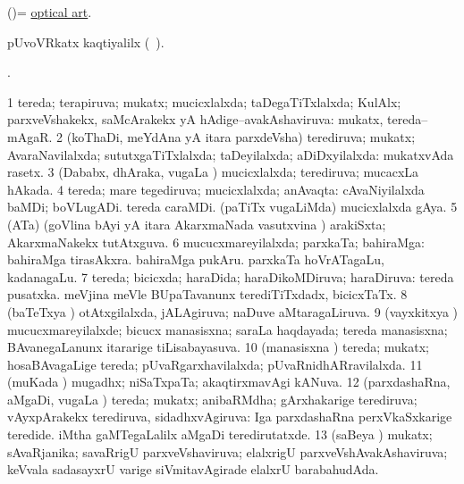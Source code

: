\bentry
{}
\gl{\nA}
\bmng
(\AmA)= \hyperlink{optical art}{optical art}. 
\emng
\eentry

\bentry
{}
\gl{\saMkiSx}
\bmng
pUvoVRkatx kaqtiyalilx (\Latin\ ). 
\emng
\eentry

\bentry
{}
\gl{\saMkiSx}
\bmng
{}. 
\emng
\eentry

\bentry
{}
\gl{\gu}
\bmng
\bnum
\num{1} tereda; terapiruva; mukatx; mucicxlalxda; taDegaTiTxlalxda; KulAlx; parxveVshakekx, saMcArakekx yA hAdige--avakAshaviruva:  mukatx, tereda--mAgaR. 
\num{2} (koThaDi, meYdAna yA itara parxdeVsha) terediruva; mukatx; AvaraNavilalxda; sututxgaTiTxlalxda; taDeyilalxda; aDiDxyilalxda:  mukatxvAda rasetx. 
\num{3} (Dababx, dhAraka, \mo vugaLa \vi) mucicxlalxda; terediruva; mucacxLa hAkada. 
\num{4} tereda; mare tegediruva; mucicxlalxda; anAvaqta:  cAvaNiyilalxda baMDi; boVLugADi.  tereda caraMDi.  (paTiTx \mo vugaLiMda) mucicxlalxda gAya. 
\num{5} (ATa) (goVlina bAyi yA itara AkarxmaNada vasutxvina \vi) arakiSxta; AkarxmaNakekx tutAtxguva. 
\num{6} mucucxmareyilalxda; parxkaTa; bahiraMga:  bahiraMga tirasAkxra.  bahiraMga pukAru.  parxkaTa hoVrATagaLu, kadanagaLu. 
\num{7} tereda; bicicxda; haraDida; haraDikoMDiruva; haraDiruva:  tereda pusatxka.  meVjina meVle BUpaTavanunx terediTiTxdadx, bicicxTaTx. 
\num{8} (baTeTxya \vi) otAtxgilalxda, jALAgiruva; naDuve aMtaragaLiruva. 
\num{9} (vayxkitxya \vi) mucucxmareyilalxde; bicucx manasisxna; saraLa haqdayada; tereda manasisxna; BAvanegaLanunx itararige tiLisabayasuva. 
\num{10} (manasisxna \vi) tereda; mukatx; hosaBAvagaLige tereda; pUvaRgarxhavilalxda; pUvaRnidhARravilalxda. 
\num{11} (muKada \vi) mugadhx; niSaTxpaTa; akaqtirxmavAgi kANuva. 
\num{12} (parxdashaRna, aMgaDi, \mo vugaLa \vi) tereda; mukatx; anibaRMdha; gArxhakarige terediruva; vAyxpArakekx terediruva, sidadhxvAgiruva:  Iga parxdashaRna perxVkaSxkarige teredide.  iMtha gaMTegaLalilx aMgaDi teredirutatxde. 
\num{13} (saBeya \vi) mukatx; sAvaRjanika; savaRrigU parxveVshaviruva; elalxrigU parxveVshAvakAshaviruva; keVvala sadasayxrU \mo varige siVmitavAgirade elalxrU barabahudAda. 
